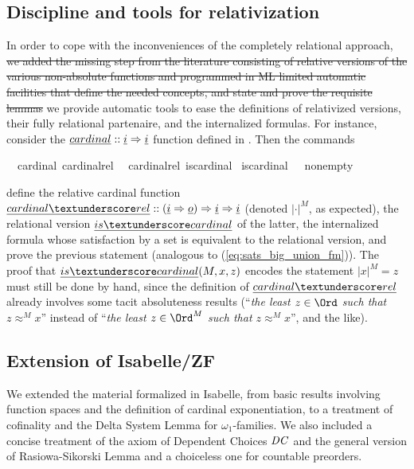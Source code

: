 \subsection{Discipline and tools for relativization}
\label{sec:tools-relativization}
In order to cope with the inconveniences of the completely relational approach, \sout{we added the missing step from the
literature consisting of relative versions of the various non-absolute
functions and programmed in ML limited automatic facilities that
define the needed concepts, and  state and
prove the requisite lemmas} we
provide automatic tools
to ease the definitions of relativized versions, their fully relational
partenaire, and the internalized formulas. For instance, consider the 
$\isa{cardinal}::\tyi \fun \tyi$ function defined in
. Then the commands
\begin{isabelle}
  \isamarkupfalse%
  \ \ {\isachardoublequoteopen}cardinal{\isachardoublequoteclose}\ {\isachardoublequoteopen}cardinal{\isacharunderscore}{\kern0pt}rel{\isachardoublequoteclose}\ \isanewline
  \isamarkupfalse%
  \ {\isachardoublequoteopen}cardinal{\isacharunderscore}{\kern0pt}rel{\isachardoublequoteclose}\ {\isachardoublequoteopen}is{\isacharunderscore}{\kern0pt}cardinal{\isachardoublequoteclose}\isanewline
  \isamarkupfalse%
  \ {\isachardoublequoteopen}is{\isacharunderscore}{\kern0pt}cardinal{\isachardoublequoteclose}\ \ \ {\isachardoublequoteopen}nonempty{\isachardoublequoteclose}%
\end{isabelle}
define the relative cardinal function
$\isa{cardinal{\uscore}rel}::(\tyi \fun \tyo) \fun \tyi \fun\tyi$
(denoted  $|\cdot|^M$, as expected),
the relational version $\isa{is{\uscore}cardinal}$ of the latter, the
internalized formula  whose
satisfaction by a set is equivalent to the relational version, and
prove the previous statement (analogous to (\ref{eq:sats_big_union_fm})).
The proof that $\isa{is{\uscore}cardinal}(M,x,z)$  encodes the
statement $|x|^M = z$ must still be done by hand, since the definition
of $\isa{cardinal{\uscore}rel}$ already involves some tacit
absoluteness results (“\textit{the least $z \in \Ord$ such that $z
  \approx^M x$}” instead
of “\textit{the least $z \in \Ord^M$ such that $z
  \approx^M x$}”, and the like).

\subsection{Extension of Isabelle/ZF}
\label{sec:extension-isabellezf}
We extended \cite{Delta_System_Lemma-AFP} the material formalized in
Isabelle, from basic results involving function spaces and the
definition of cardinal exponentiation, to a treatment of cofinality
and the Delta System Lemma for $\omega_1$-families. We also included a
concise treatment of the axiom of Dependent Choices $\mathit{DC}$ and the
general version of Rasiowa-Sikorski Lemma \cite{2018arXiv180705174G}
and a choiceless one for countable preorders.

